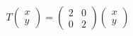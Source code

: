 \documentclass[preview]{standalone}
\begin{document}
\begin{align*}
T\begin{pmatrix} x \\ y \end{pmatrix} = \begin{pmatrix} 2 & 0 \\ 0 & 2 \end{pmatrix} \begin{pmatrix} x \\ y \end{pmatrix}
\end{align*}
\end{document}
